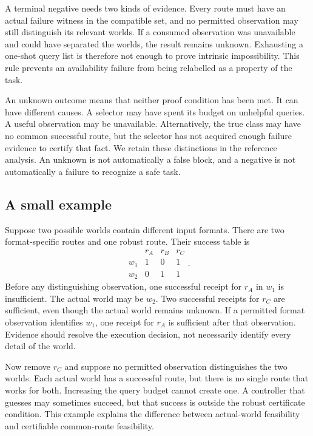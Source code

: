 \documentclass[conference]{IEEEtran}
\begin{document}
A terminal negative needs two kinds of evidence. Every route must have an actual failure witness in the compatible set, and no permitted observation may still distinguish its relevant worlds. If a consumed observation was unavailable and could have separated the worlds, the result remains unknown. Exhausting a one-shot query list is therefore not enough to prove intrinsic impossibility. This rule prevents an availability failure from being relabelled as a property of the task.

An unknown outcome means that neither proof condition has been met. It can have different causes. A selector may have spent its budget on unhelpful queries. A useful observation may be unavailable. Alternatively, the true class may have no common successful route, but the selector has not acquired enough failure evidence to certify that fact. We retain these distinctions in the reference analysis. An unknown is not automatically a false block, and a negative is not automatically a failure to recognize a safe task.

\subsection{A small example}
Suppose two possible worlds contain different input formats. There are two format-specific routes and one robust route. Their success table is
\begin{equation}
\begin{array}{c|ccc}
 &r_A&r_B&r_C\\\hline
w_1&1&0&1\\
w_2&0&1&1
\end{array}.
\label{eq:example}
\end{equation}
Before any distinguishing observation, one successful receipt for $r_A$ in $w_1$ is insufficient. The actual world may be $w_2$. Two successful receipts for $r_C$ are sufficient, even though the actual world remains unknown. If a permitted format observation identifies $w_1$, one receipt for $r_A$ is sufficient after that observation. Evidence should resolve the execution decision, not necessarily identify every detail of the world.

Now remove $r_C$ and suppose no permitted observation distinguishes the two worlds. Each actual world has a successful route, but there is no single route that works for both. Increasing the query budget cannot create one. A controller that guesses may sometimes succeed, but that success is outside the robust certificate condition. This example explains the difference between actual-world feasibility and certifiable common-route feasibility.
\end{document}
